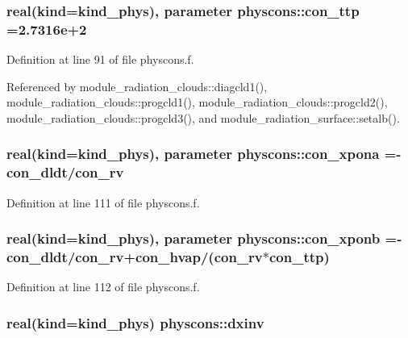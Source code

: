 \subsubsection[{\texorpdfstring{con\+\_\+ttp}{con_ttp}}]{\setlength{\rightskip}{0pt plus 5cm}real(kind=kind\+\_\+phys), parameter physcons\+::con\+\_\+ttp =2.\+7316e+2}\hypertarget{namespacephyscons_aa50af91a0e1d09edce2d2e6c4d7afc86}{}\label{namespacephyscons_aa50af91a0e1d09edce2d2e6c4d7afc86}


Definition at line 91 of file physcons.\+f.



Referenced by module\+\_\+radiation\+\_\+clouds\+::diagcld1(), module\+\_\+radiation\+\_\+clouds\+::progcld1(), module\+\_\+radiation\+\_\+clouds\+::progcld2(), module\+\_\+radiation\+\_\+clouds\+::progcld3(), and module\+\_\+radiation\+\_\+surface\+::setalb().

\subsubsection[{\texorpdfstring{con\+\_\+xpona}{con_xpona}}]{\setlength{\rightskip}{0pt plus 5cm}real(kind=kind\+\_\+phys), parameter physcons\+::con\+\_\+xpona =-\/{\bf con\+\_\+dldt}/{\bf con\+\_\+rv}}\hypertarget{namespacephyscons_a27a44ed341fdf3b37b2052e8b8aa7690}{}\label{namespacephyscons_a27a44ed341fdf3b37b2052e8b8aa7690}


Definition at line 111 of file physcons.\+f.

\subsubsection[{\texorpdfstring{con\+\_\+xponb}{con_xponb}}]{\setlength{\rightskip}{0pt plus 5cm}real(kind=kind\+\_\+phys), parameter physcons\+::con\+\_\+xponb =-\/{\bf con\+\_\+dldt}/{\bf con\+\_\+rv}+{\bf con\+\_\+hvap}/({\bf con\+\_\+rv}$\ast${\bf con\+\_\+ttp})}\hypertarget{namespacephyscons_aa6b24a26902b52f4907f6419ebe3679a}{}\label{namespacephyscons_aa6b24a26902b52f4907f6419ebe3679a}


Definition at line 112 of file physcons.\+f.

\subsubsection[{\texorpdfstring{dxinv}{dxinv}}]{\setlength{\rightskip}{0pt plus 5cm}real(kind=kind\+\_\+phys) physcons\+::dxinv}\hypertarget{namespacephyscons_ab94b4700f51149d28ed380c687f36c49}{}\label{namespacephyscons_ab94b4700f51149d28ed380c687f36c49}


